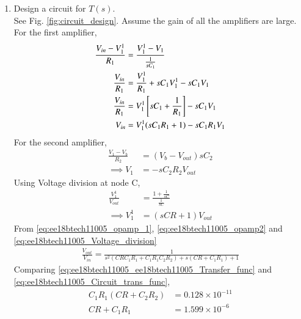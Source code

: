 \begin{enumerate}[label=\arabic*.,ref=\theenumi]
\begin{figure}[!ht]
\caption{}
\label{fig:ee18btech11005_2}
\end{figure}

\item Design a circuit for $T(s)$.\\
\solution See Fig. \ref{fig:circuit_design}.  Assume the gain of all the amplifiers are large.
For the first amplifier,
\begin{align}
    \frac{V_{in}-V_1^1}{R_1} &= \frac{V_1^1-V_1}{\frac{1}{sC_1}}\\
    \frac{V_{in}}{R_1} &= \frac{V_1^1}{R_1}+sC_1V_1^1 - sC_1V_1 \\
    \frac{V_{in}}{R_1} &= V_1^1{}\left[sC_1+\frac{1}{R_1}\right]-sC_1V_1\\
    V_{in} &= V_1^1(sC_1R_1+1)-sC_1R_1V_1\label{eq:ee18btech11005_opamp_1}
\end{align}
For the second amplifier,
\begin{align}
    \frac{V_1-V_b}{R_2} &= (V_b-V_{out})sC_2\\
    \implies V_1 &= -sC_2R_2V_{out}\label{eq:ee18btech11005_opamp2}
\end{align}
Using Voltage division at node C,
\begin{align}
    \frac{V_1^1}{V_{out}} &= \frac{1+\frac{1}{sC}}{\frac{1}{sC}}\\
    \implies V_1^1 &= (sCR+1)V_{out}\label{eq:ee18btech11005_Voltage_division}
\end{align}
From \eqref{eq:ee18btech11005_opamp_1}, \eqref{eq:ee18btech11005_opamp2}  and \eqref{eq:ee18btech11005_Voltage_division}
 \begin{multline}
   \frac{V_{out}}{V_{in}}=\frac{1}{s^2(CRC_1R_1+C_1R_1C_2R_2) + s(CR+C_1R_1) + 1} \label{eq:ee18btech11005_Circuit_trans_func}
\end{multline}
Comparing \eqref{eq:ee18btech11005_ee18btech11005_Transfer_func} and \eqref{eq:ee18btech11005_Circuit_trans_func},
\begin{align}
      C_1R_1(CR+C_2R_2) &= 0.128\times10^{-11} \\
   CR+C_1R_1 &= 1.599\times10^{-6}\\

\end{align}
\end{enumerate}
